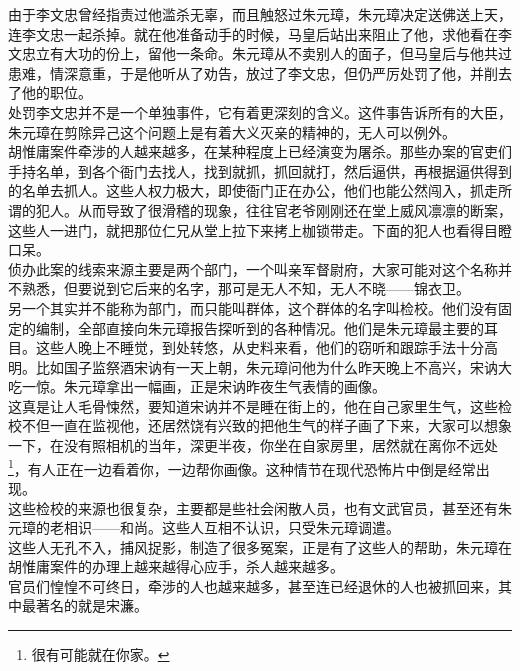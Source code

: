 \begin{multicols}{\theparacolNo}
由于李文忠曾经指责过他滥杀无辜，而且触怒过朱元璋，朱元璋决定送佛送上天，连李文忠一起杀掉。就在他准备动手的时候，马皇后站出来阻止了他，求他看在李文忠立有大功的份上，留他一条命。朱元璋从不卖别人的面子，但马皇后与他共过患难，情深意重，于是他听从了劝告，放过了李文忠，但仍严厉处罚了他，并削去了他的职位。\\

处罚李文忠并不是一个单独事件，它有着更深刻的含义。这件事告诉所有的大臣，朱元璋在剪除异己这个问题上是有着大义灭亲的精神的，无人可以例外。\\

胡惟庸案件牵涉的人越来越多，在某种程度上已经演变为屠杀。那些办案的官吏们手持名单，到各个衙门去找人，找到就抓，抓回就打，然后逼供，再根据逼供得到的名单去抓人。这些人权力极大，即使衙门正在办公，他们也能公然闯入，抓走所谓的犯人。从而导致了很滑稽的现象，往往官老爷刚刚还在堂上威风凛凛的断案，这些人一进门，就把那位仁兄从堂上拉下来拷上枷锁带走。下面的犯人也看得目瞪口呆。\\

侦办此案的线索来源主要是两个部门，一个叫亲军督尉府，大家可能对这个名称并不熟悉，但要说到它后来的名字，那可是无人不知，无人不晓——锦衣卫。\\

另一个其实并不能称为部门，而只能叫群体，这个群体的名字叫检校。他们没有固定的编制，全部直接向朱元璋报告探听到的各种情况。他们是朱元璋最主要的耳目。这些人晚上不睡觉，到处转悠，从史料来看，他们的窃听和跟踪手法十分高明。比如国子监祭酒宋讷有一天上朝，朱元璋问他为什么昨天晚上不高兴，宋讷大吃一惊。朱元璋拿出一幅画，正是宋讷昨夜生气表情的画像。\\

这真是让人毛骨悚然，要知道宋讷并不是睡在街上的，他在自己家里生气，这些检校不但一直在监视他，还居然饶有兴致的把他生气的样子画了下来，大家可以想象一下，在没有照相机的当年，深更半夜，你坐在自家房里，居然就在离你不远处\footnote{很有可能就在你家。}，有人正在一边看着你，一边帮你画像。这种情节在现代恐怖片中倒是经常出现。\\

这些检校的来源也很复杂，主要都是些社会闲散人员，也有文武官员，甚至还有朱元璋的老相识——和尚。这些人互相不认识，只受朱元璋调遣。\\

这些人无孔不入，捕风捉影，制造了很多冤案，正是有了这些人的帮助，朱元璋在胡惟庸案件的办理上越来越得心应手，杀人越来越多。\\

官员们惶惶不可终日，牵涉的人也越来越多，甚至连已经退休的人也被抓回来，其中最著名的就是宋濂。\\


\end{multicols}
